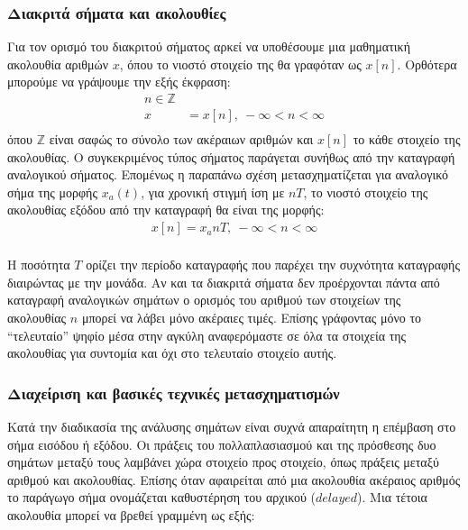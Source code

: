 \documentclass[breaklines=true, 12pt]{article}
\begin{document}
\subsubsection{Διακριτά σήματα και ακολουθίες}
\label{sec:orgfb3bbec}
Για τον ορισμό του διακριτού σήματος αρκεί να υποθέσουμε μια μαθηματική
ακολουθία αριθμών \(x\), όπου το νιοστό στοιχείο της θα γραφόταν ως \(x[n]\).
Ορθότερα μπορούμε να γράψουμε την εξής έκφραση:
\begin{equation}
\begin{align}
n \in \mathbb{Z} \\
x &= {x[n]},\  -\infty < n < \infty \\
\end{align}
\end{equation}
όπου \(\mathbb{Z}\) είναι σαφώς το σύνολο των ακέραιων αριθμών και \(x[n]\) το κάθε στοιχείο
της ακολουθίας. Ο συγκεκριμένος τύπος σήματος παράγεται συνήθως από την
καταγραφή αναλογικού σήματος. Επομένως η παραπάνω σχέση μετασχηματίζεται
για αναλογικό σήμα της μορφής \(x_{a}(t)\), για χρονική στιγμή ίση με \(nT\), το
νιοστό στοιχείο της ακολουθίας εξόδου από την καταγραφή θα είναι της
μορφής:
\begin{equation}
\begin{align}
x[n] = x_{a} nT,\ -\infty < n < \infty \\
\end{align}
\end{equation}

Η ποσότητα \(T\) ορίζει την περίοδο καταγραφής που παρέχει την συχνότητα
καταγραφής διαιρώντας με την μονάδα. Αν και τα διακριτά σήματα δεν
προέρχονται πάντα από καταγραφή αναλογικών σημάτων ο ορισμός του αριθμού
των στοιχείων της ακολουθίας \(n\) μπορεί να λάβει μόνο ακέραιες τιμές. Επίσης
γράφοντας μόνο το “τελευταίο” ψηφίο μέσα στην αγκύλη αναφερόμαστε σε όλα
τα στοιχεία της ακολουθίας για συντομία και όχι στο τελευταίο στοιχείο
αυτής.
\subsubsection{Διαχείριση και βασικές τεχνικές μετασχηματισμών}
\label{sec:org0a9f09d}
Κατά την διαδικασία της ανάλυσης σημάτων είναι συχνά απαραίτητη η επέμβαση
στο σήμα εισόδου ή εξόδου. Οι πράξεις του πολλαπλασιασμού και της πρόσθεσης
δυο σημάτων μεταξύ τους λαμβάνει χώρα στοιχείο προς στοιχείο, όπως πράξεις
μεταξύ αριθμού και ακολουθίας. Επίσης όταν αφαιρείται από μια ακολουθία
ακέραιος αριθμός το παράγωγο σήμα ονομάζεται καθυστέρηση του αρχικού
(\(delayed\)). Μια τέτοια ακολουθία μπορεί να βρεθεί γραμμένη ως εξής:
\end{document}
